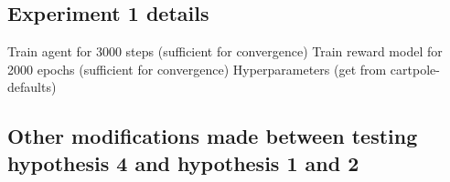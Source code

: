 \documentclass[11pt, a4paper, bibliography=totoc]{report}
\begin{document}
\subsection{Experiment 1 details} %
Train agent for 3000 steps (sufficient for convergence)
Train reward model for 2000 epochs (sufficient for convergence)
Hyperparameters (get from cartpole-defaults)

\subsection{Other modifications made between testing hypothesis 4 and hypothesis 1 and 2} \label{sec:other_changes}
\end{document}
